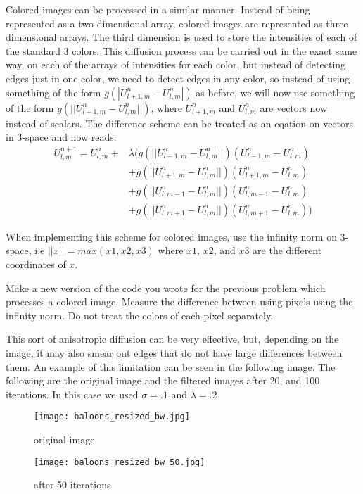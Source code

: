 Colored images can be processed in a similar manner.
Instead of being represented as a two-dimensional array, colored images are represented as three dimensional arrays.
The third dimension is used to store the intensities of each of the standard 3 colors.
This diffusion process can be carried out in the exact same way, on each of the arrays of intensities for each color, but instead of detecting edges just in one color, we need to detect edges in any color, so instead of using something of the form $g(|U_{l+1,m}^n - U_{l,m}^n|)$ as before, we will now use something of the form $g(||U_{l+1,m}^n - U_{l,m}^n||)$, where $U_{l+1,m}^n$ and $U_{l,m}^n$ are vectors now instead of scalars.
The difference scheme can be treated as an eqation on vectors in 3-space and now reads:
\begin{align*}
U_{l,m}^{n+1} = U_{l,m}^n + & \lambda (g(||U_{l-1,m}^n - U_{l,m}^n||)(U_{l-1,m}^n - U_{l,m}^n) \\
					& + g(||U_{l+1,m}^n - U_{l,m}^n||)(U_{l+1,m}^n - U_{l,m}^n) \\
					& + g(||U_{l,m-1}^n - U_{l,m}^n||)(U_{l,m-1}^n - U_{l,m}^n) \\
					& + g(||U_{l,m+1}^n - U_{l,m}^n||)(U_{l,m+1}^n - U_{l,m}^n))
\end{align*}

When implementing this scheme for colored images, use the infinity norm on 3-space, i.e $||x||=max(x1,x2,x3)$ where $x1$, $x2$, and $x3$ are the different coordinates of $x$.

\begin{problem}
Make a new version of the code you wrote for the previous problem which processes a colored image.
Measure the difference between using pixels using the infinity norm.
Do not treat the colors of each pixel separately.
\end{problem}

This sort of anisotropic diffusion can be very effective, but, depending on the image, it may also smear out edges that do not have large differences between them.
An example of this limitation can be seen in the following image.
The following are the original image and the filtered images after 20, and 100 iterations.
In this case we used $\sigma = .1$ and $\lambda = .2$

\begin{figure}[ht]
\begin{minipage}[b]{.45\linewidth}
\centering
\texttt{[image: baloons\_resized\_bw.jpg]}
\caption*{original image}
\end{minipage}
\hspace{0.5cm}
\begin{minipage}[b]{0.45\linewidth}
\centering
\texttt{[image: baloons\_resized\_bw\_50.jpg]}
\caption*{after 50 iterations}
\end{minipage}
\end{figure}


